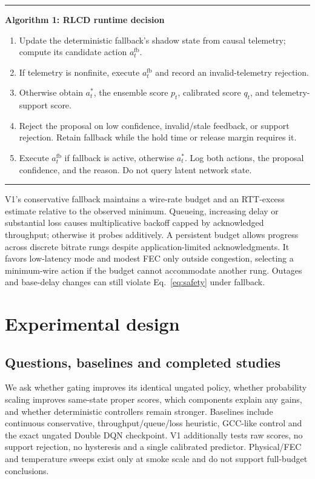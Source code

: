 \documentclass[10pt]{article}
\begin{document}
\begin{table}[t]
\centering
\begin{minipage}{.94\linewidth}
\hrule\vspace{4pt}
\textbf{Algorithm 1: RLCD runtime decision}
\begin{enumerate}
\item Update the deterministic fallback's shadow state from causal telemetry; compute its candidate action $a_t^{\mathrm{fb}}$.
\item If telemetry is nonfinite, execute $a_t^{\mathrm{fb}}$ and record an invalid-telemetry rejection.
\item Otherwise obtain $a_t^*$, the ensemble score $p_t$, calibrated score $q_t$, and telemetry-support score.
\item Reject the proposal on low confidence, invalid/stale feedback, or support rejection. Retain fallback while the hold time or release margin requires it.
\item Execute $a_t^{\mathrm{fb}}$ if fallback is active, otherwise $a_t^*$. Log both actions, the proposal confidence, and the reason. Do not query latent network state.
\end{enumerate}
\hrule
\end{minipage}
\caption{Telemetry-only deployment interface. Simulator counterfactuals are evaluation tools and are absent from this runtime decision.}
\end{table}

V1's conservative fallback maintains a wire-rate budget and an RTT-excess estimate relative to the observed minimum. Queueing, increasing delay or substantial loss causes multiplicative backoff capped by acknowledged throughput; otherwise it probes additively. A persistent budget allows progress across discrete bitrate rungs despite application-limited acknowledgments. It favors low-latency mode and modest FEC only outside congestion, selecting a minimum-wire action if the budget cannot accommodate another rung. Outages and base-delay changes can still violate Eq.~\ref{eq:safety} under fallback.

\section{Experimental design}
\subsection{Questions, baselines and completed studies}
We ask whether gating improves its identical ungated policy, whether probability scaling improves same-state proper scores, which components explain any gains, and whether deterministic controllers remain stronger. Baselines include continuous conservative, throughput/queue/loss heuristic, GCC-like control and the exact ungated Double DQN checkpoint. V1 additionally tests raw scores, no support rejection, no hysteresis and a single calibrated predictor. Physical/FEC and temperature sweeps exist only at smoke scale and do not support full-budget conclusions.
\end{document}
